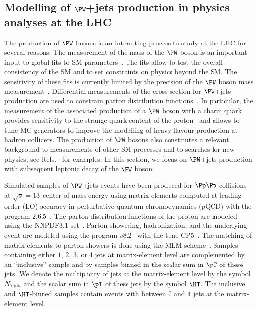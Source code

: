 \subsection{Modelling of \texorpdfstring{$\PW$}{W}+jets production in physics analyses at the LHC}
\label{sec:examples_background_yield}

The production of $\PW$ bosons is an interesting process to study at the LHC for several reasons.
The measurement of the mass of the $\PW$ boson is an important input to global fits to SM parameters~\cite{Baak:2014ora}.
The fits allow to test the overall consistency of the SM and to set constraints on physics beyond the SM.
The sensitivity of these fits is currently limited by the precision of the $\PW$ boson mass measurement~\cite{Baak:2014ora}.
Differential measurements of the cross section for $\PW$+jets production 
are used to constrain parton distribution functions~\cite{CMS:2016qqr,ATLAS:2016nqi,ATLAS:2019fgb,CMS:2020cph}.
In particular, the measurement of the associated production of a $\PW$ boson with a charm quark
provides sensitivity to the strange quark content of the proton~\cite{CMS:2013wql,ATLAS:2014jkm,CMS:2018dxg} 
and allows to tune MC generators to improve the modelling of heavy-flavour production at hadron colliders.
The production of $\PW$ bosons also constitutes a relevant background to measurements of other SM processes
and to searches for new physics, see Refs.~\cite{ATLAS:2014aga,Aad:2019yxi,CMS-HIG-13-027,CMS-HIG-17-006} for examples.
In this section, we focus on $\PW$+jets production with subsequent leptonic decay of the $\PW$ boson.

Simulated samples of $\PW$+jets events have been produced for $\Pp\Pp$ collisions at $\sqrt{s}=13$~\TeV center-of-mass energy
using matrix elements computed at leading order (LO) accuracy in perturbative quantum chromodynamics (pQCD)
with the program \MGvATNLO $2.6.5$~\cite{MGvATNLO}.
The parton distribution functions of the proton are modeled using the NNPDF3.1 set~\cite{NNPDF:2017mvq}.
Parton showering, hadronization, and the underlying event are modeled using the program \PYTHIA $v8.2$~\cite{PYTHIA} with the tune \textrm{CP5}~\cite{Sirunyan:2019dfx}.
The matching of matrix elements to parton showers is done using the \textrm{MLM} scheme~\cite{Alwall:2007fs}.
Samples containing either $1$, $2$, $3$, or $4$ jets at matrix-element level are complemented by an ``inclusive'' sample 
and by samples binned in the scalar sum in $\pT$ of these jets.
We denote the multiplicity of jets at the matrix-element level by the symbol $N_{\jet}$ and the scalar sum in $\pT$ of these jets by the symbol $\HT$.
The inclusive and $\HT$-binned samples contain events with between $0$ and $4$ jets at the matrix-element level.

